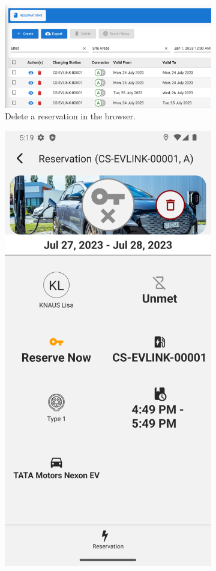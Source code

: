 \begin{figure}[h]
    \centering
     \begin{subfigure}[c]{0.6\textwidth}
         \includegraphics[width=\textwidth]{resources/images/main/6_implementation/screens/delete_reservation/web/Delete_Reservation.png}
         \captionsetup{skip=58pt}
         \caption{Delete a reservation in the browser.}
         \label{fig:web-delete-reservation-impl}
    \end{subfigure}
     \hfill
     \begin{subfigure}[c]{0.3\textwidth}
        \includegraphics[width=\textwidth,height=1.5\textwidth,keepaspectratio]{resources/images/main/6_implementation/screens/delete_reservation/mobile/Delete_Reservation.png}

\end{subfigure}
\end{figure}
